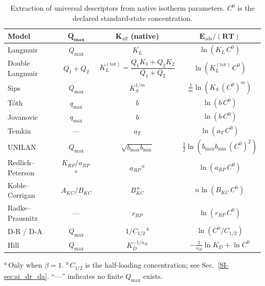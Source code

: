 \documentclass[journal=jacsat,manuscript=article]{achemso}
\begin{document}
	\begin{table}[H]
		\small
		\caption{Extraction of universal descriptors from native isotherm parameters. $C^{0}$ is the declared standard-state concentration.}
		\label{tab:extraction}
		\renewcommand{\arraystretch}{1.3}
		\begin{tabular}{@{} l c c c @{}}
			\hline
			\textbf{Model}
			& $\boldsymbol{Q_{\max}}$
			& $\boldsymbol{K_{\mathrm{aff}}}$ \textbf{(native)}
			& $\boldsymbol{E_{\mathrm{ads}}/(RT)}$ \\
			\hline
			Langmuir
			& $Q_{\max}$
			& $K_L$
			& $\ln(K_L\, C^{0})$ \\
			Double Langmuir
			& $Q_1 + Q_2$
			& $K_L^{\mathrm{(tot)}} = \dfrac{Q_1K_1 + Q_2K_2}{Q_1+Q_2}$
			& $\ln(K_L^{\mathrm{(tot)}}\, C^{0})$ \\
			Sips
			& $Q_{\max}$
			& $K_S^{1/m}$
			& $\frac{1}{m}\ln(K_S\, (C^{0})^{m})$ \\
			T\'{o}th
			& $q_{\max}$
			& $b$
			& $\ln(b\, C^{0})$ \\
			Jovanovic
			& $q_{\max}$
			& $b$
			& $\ln(b\, C^{0})$ \\
			Temkin
			& ---
			& $a_T$
			& $\ln(a_T\, C^{0})$ \\
			UNILAN
			& $Q_{\max}$
			& $\sqrt{b_{\max} b_{\min}}$
			& $\tfrac{1}{2}\ln(b_{\max} b_{\min}\,(C^{0})^{2})$ \\
			Redlich--Peterson
			& $K_{RP}/a_{RP}$\,$^{a}$
			& $a_{RP}$\,$^{a}$
			& $\ln(a_{RP}\, C^{0})$ \\
			Koble--Corrigan
			& $A_{KC}/B_{KC}$
			& $B_{KC}^{\,n}$
			& $n\ln(B_{KC}\, C^{0})$ \\
			Radke--Prausnitz
			& ---
			& $r_{RP}$
			& $\ln(r_{RP}\, C^{0})$ \\
			D-R / D-A
			& $Q_{\max}$
			& $1/C_{1/2}$\,$^{b}$
			& $\ln(C^{0}/C_{1/2})$ \\
			Hill
			& $Q_{\max}$
			& $K_D^{-1/n_H}$
			& $-\frac{1}{n_H}\ln K_D + \ln C^{0}$ \\
			\hline
		\end{tabular}

		\smallskip
		\noindent $^{a}$\,Only when $\beta = 1$.\quad
		$^{b}$\,$C_{1/2}$ is the half-loading concentration; see Sec.~\ref{SI-sec:si_dr_da}.\quad
		``---'' indicates no finite $Q_{\max}$ exists.
	\end{table}
\end{document}

